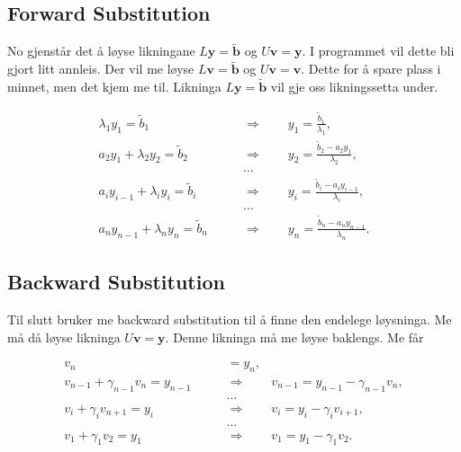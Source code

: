 \documentclass[11pt, a4paper]{article}
\begin{document}
  \subsection{Forward Substitution}
    No gjenstår det å løyse likningane $L\mathbf{y} = \mathbf{\tilde{b}}$ og $U\mathbf{v} =
    \mathbf{y}$. I programmet vil dette bli gjort litt annleis. Der vil me løyse $L\mathbf{v} 
    = \mathbf{\tilde{b}}$ og $U\mathbf{v} = \mathbf{v}$. Dette for å spare plass i minnet, men det 
    kjem me til. Likninga $L\mathbf{y} = \mathbf{\tilde{b}}$ vil gje oss likningssetta under.
    
    \begin{equation*}
      \begin{align}
        \lambda_1y_1 = \tilde{b}_1 \qquad &\Rightarrow \qquad y_1 = \frac{\tilde{b}_1}{\lambda_1}, \\
        a_2y_1 + \lambda_2y_2 = \tilde{b}_2 \qquad &\Rightarrow \qquad y_2 = \frac{\tilde{b}_2 - a_2
        y_1}{\lambda_2}, \\
        &\dots \\
        a_iy_{i-1} + \lambda_iy_i = \tilde{b}_i \qquad &\Rightarrow \qquad y_i = \frac{\tilde{b}_i
        - a_iy_{i-1}}{\lambda_i}, \\
        &\dots \\
        a_ny_{n-1} + \lambda_ny_n = \tilde{b}_n \qquad &\Rightarrow \qquad y_n = \frac{\tilde{b}_n
        - a_ny_{n-1}}{\lambda_n}.
      \end{align}
    \end{equation*}

  \subsection{Backward Substitution}
    Til slutt bruker me backward substitution til å finne den endelege løysninga. Me må då løyse
    likninga $U\mathbf{v} = \mathbf{y}$. Denne likninga må me løyse baklengs. Me får

    \begin{equation*}
      \begin{align}
        v_n &= y_n, \\
        v_{n-1} + \gamma_{n-1}v_n = y_{n-1} \qquad &\Rightarrow \qquad v_{n-1} = y_{n-1} - 
        \gamma_{n-1}v_n, \\
        &\dots \\
        v_i + \gamma_iv_{n+1} = y_i \qquad &\Rightarrow \qquad v_i = y_i - \gamma_iv_{i+1}, \\
        &\dots \\
        v_1 + \gamma_1v_2 = y_1 \qquad &\Rightarrow \qquad v_1 = y_1 - \gamma_1v_2.
      \end{align}
    \end{equation*}
\end{document}
